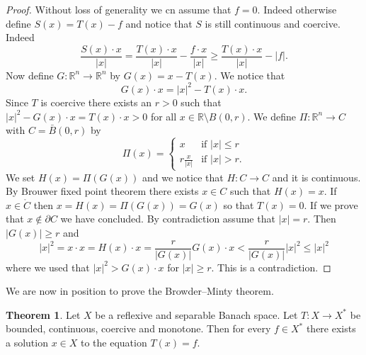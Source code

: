 \documentclass[a4paper,10pt,oneside]{amsbook}
\numberwithin{section}{chapter}
\numberwithin{equation}{chapter}
\theoremstyle{definition}
\newtheorem{thm}[prop]{Theorem}
\begin{document}
\begin{proof}
Without loss of generality we cn assume that $f=0$. Indeed otherwise define $S(x)=T(x)-f$ and notice that $S$ is still continuous and coercive. Indeed
\[
\frac{S(x)\cdot x}{|x|}=\frac{T(x)\cdot x}{|x|}-\frac{f\cdot x}{|x|}\ge\frac{T(x)\cdot x}{|x|}-|f|.
\]
Now define $G\colon\mathbb{R}^n\to\mathbb{R}^n$ by $G(x)=x-T(x)$. We notice that
\[
G(x)\cdot x=|x|^2-T(x)\cdot x.
\]
Since $T$ is coercive there exists an $r>0$ such that $|x|^2-G(x)\cdot x=T(x)\cdot x>0$ for all $x\in\mathbb{R}\setminus B(0,r)$. We define $\Pi\colon\mathbb{R}^n\to C$ with $C=\bar{B}(0,r)$ by
\[
\Pi(x)=
\begin{cases}
x & \text{if $|x|\le r$} \\
r\frac{x}{|x|} & \text{if $|x|>r$}.
\end{cases}
\]
We set $H(x)=\Pi(G(x))$ and we notice that $H\colon C\to C$ and it is continuous. By Brouwer fixed point theorem there exists $x\in C$ such that $H(x)=x$. If $x\in\mathring{C}$ then $x=H(x)=\Pi(G(x))=G(x)$ so that $T(x)=0$. If we prove that $x\notin\partial C$ we have concluded. By contradiction assume that $|x|=r$. Then $|G(x)|\ge r$ and
\[
|x|^2=x\cdot x=H(x)\cdot x=\frac{r}{|G(x)|}G(x)\cdot x<\frac{r}{|G(x)|}|x|^2\le|x|^2
\]
where we used that $|x|^2>G(x)\cdot x$ for $|x|\ge r$. This is a contradiction.
\end{proof}
We are now in position to prove the Browder--Minty theorem.
\begin{thm}
\label{thm:browder-minty}
Let $X$ be a reflexive and separable Banach space. Let $T\colon X\to X^*$ be bounded, continuous, coercive and monotone. Then for every $f\in X^*$ there exists a solution $x\in X$ to the equation $T(x)=f$.
\end{thm}
\end{document}

